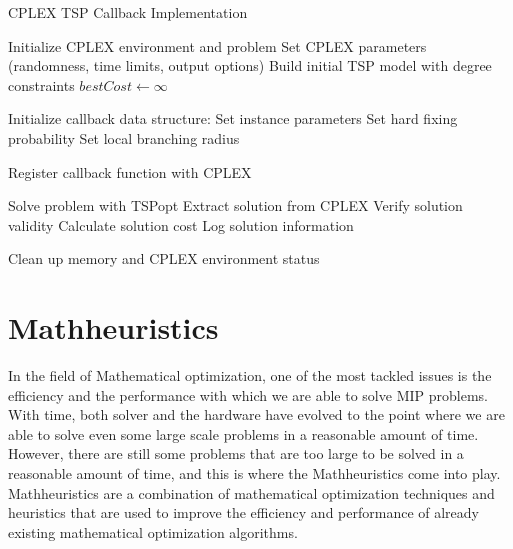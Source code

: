 \documentclass{article}
\begin{document}
\begin{algorithm}[!ht]
	\caption{CPLEX TSP Callback Implementation}
	\begin{algorithmic}[1]
	\State Initialize CPLEX environment and problem
	\State Set CPLEX parameters (randomness, time limits, output options)
	\State Build initial TSP model with degree constraints
	\State $bestCost \gets \infty$
	
	\State Initialize callback data structure:
	\State \hspace{\algorithmicindent} Set instance parameters
	\State \hspace{\algorithmicindent} Set hard fixing probability
	\State \hspace{\algorithmicindent} Set local branching radius
	
	\State Register callback function with CPLEX
	\State {}
	\State {}
	\State {}
	\State {}
	
	\State Solve problem with TSPopt
	\State Extract solution from CPLEX
	\State Verify solution validity
	\State Calculate solution cost
	\State Log solution information
	
	\State Clean up memory and CPLEX environment
	\State \Return status
	\EndProcedure
	\end{algorithmic}
	\end{algorithm}


\newpage

\section{Mathheuristics}
In the field of Mathematical optimization, one of the most tackled issues is the efficiency and the performance with which
we are able to solve MIP problems. With time, both solver and the hardware have evolved to the point where we are able to solve even some large scale problems 
in a reasonable amount of time. However, there are still some problems that are too large to be solved in a reasonable amount of time, 
and this is where the Mathheuristics come into play. 
Mathheuristics are a combination of mathematical optimization techniques and heuristics that are used to improve the efficiency and performance of 
already existing mathematical optimization algorithms.\cite{Fischetti2003LocalBranching}\cite{Fischetti2016Matheuristics} \\
\end{document}
